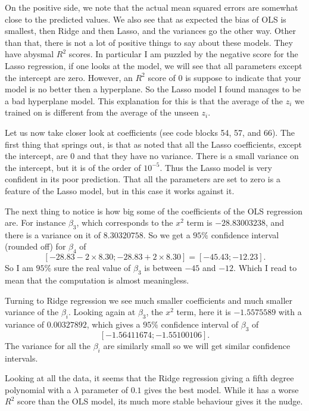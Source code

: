 \documentclass[parskip=half]{scrartcl}
\theoremstyle{definition}
\theoremstyle{remark}
\begin{document}
On the positive side, we note that the actual mean squared errors are somewhat close to the predicted values.
We also see that as expected the bias of OLS is smallest, then Ridge and then Lasso, and the variances go the other way.    
Other than that, there is not a lot of positive things to say about these models. 
They have abysmal $R^2$ scores.
In particular I am puzzled by the negative score for the Lasso regression, if one looks at the model, we will see that all parameters except the intercept are zero. 
However, an $R^2$ score of $0$ is suppose to indicate that your model is no better then a hyperplane. 
So the Lasso model I found manages to be a bad hyperplane model.  
This explanation for this is that the average of the $z_i$ we trained on is different from the average of the unseen $z_i$.

Let us now take closer look at coefficients (see code blocks 54, 57, and 66).
The first thing that springs out, is that as noted that all the Lasso coefficients, except the intercept, are $0$ and that they have no variance. 
There is a small variance on the intercept, but it is of the order of $10^{-5}$. 
Thus the Lasso model is very confident in its poor prediction. 
That all the parameters are set to zero is a feature of the Lasso model, but in this case it works against it. 

The next thing to notice is how big some of the coefficients of the OLS regression are.
For instance $\beta_3$, which corresponds to the $x^2$ term is $-28.83003238$, and there is a variance on it of $8.30320758$.
So we get a $95\%$ confidence interval (rounded off) for $\beta_4$ of 
\[
	[-28.83 - 2 \times 8.30; -28.83 + 2 \times 8.30] = [-45.43; -12.23].  
\]
So I am $95\%$ sure the real value of $\beta_3$ is between $-45$ and $-12$.
Which I read to mean that the computation is almost meaningless. 

Turning to Ridge regression we see much smaller coefficients and much smaller variance of the $\beta_i$. 
Looking again at $\beta_3$, the $x^2$ term, here it is $-1.5575589$ with a variance of $0.00327892$, which gives a $95\%$ confidence interval of $\beta_3$ of 
\[
	[-1.56411674; -1.55100106].
\]
The variance for all the $\beta_i$ are similarly small so we will get similar confidence intervals. 

Looking at all the data, it seems that the Ridge regression giving a fifth degree polynomial with a $\lambda$ parameter of $0.1$ gives the best model. 
While it has a worse $R^2$ score than the OLS model, its much more stable behaviour gives it the nudge. 
\end{document}
